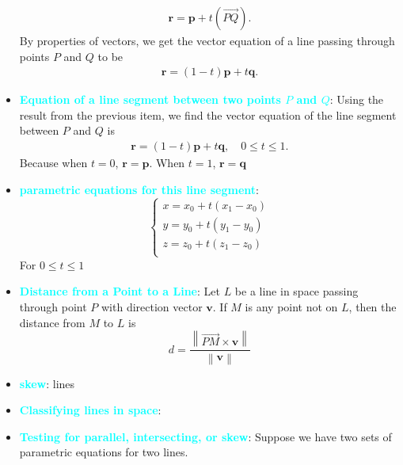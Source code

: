 \documentclass{report}
\begin{document}
\begin{itemize}
            \begin{align*}
                \mathbf{r} = \mathbf{p} + t\left(\vec{PQ}\right)
            .\end{align*} 
            By properties of vectors, we get the vector equation of a line passing through points $P$ and $Q$ to be 
            \begin{align*}
                \mathbf{r} = (1-t)\mathbf{p} + t\mathbf{q}
            .\end{align*}
        \item \textbf{\textcolor{cyan}{Equation of a line segment between two points $P$ and $Q$}}: Using the result from the previous item, we find the vector equation of the line segment between  $P$ and $Q$ is
            \begin{align*}
                \mathbf{r} = (1-t)\mathbf{p} + t\mathbf{q}, \quad 0 \leq t \leq 1
            .\end{align*}
            \bigbreak \noindent 
            Because when $t=0$, $\mathbf{r} = \mathbf{p}$. When $t=1$, $\mathbf{r}=\mathbf{q}$
        \item \textbf{\textcolor{cyan}{parametric equations for this line segment}}:
               \begin{equation}
                    \begin{cases}
                        x =  x_{0}+ t(x_{1} - x_{0})\\
                        y =  y_{0}+ t(y_{1} - y_{0})\\
                        z =  z_{0}+ t(z_{1} - z_{0})\\
                    \end{cases}
                \end{equation}
            For $0 \leq t \leq 1 $
        \item \textbf{\textcolor{cyan}{Distance from a Point to a Line}}:
            Let $L$ be a line in space passing through point $P$ with direction vector $\mathbf{v}$. If $M$ is any point not on $L$, then the distance from $M$ to $L$ is
            \[
                d = \frac{\left\| \overrightarrow{PM} \times \mathbf{v} \right\|}{\left\| \mathbf{v} \right\|}
            \]
        \item \textbf{\textcolor{cyan}{skew}}: lines
        \item \textbf{\textcolor{cyan}{Classifying lines in space}}:
            \bigbreak \noindent 
        \item \textbf{\textcolor{cyan}{Testing for parallel, intersecting, or skew}}: Suppose we have two sets of parametric equations for two lines.

\end{itemize}
\end{document}
